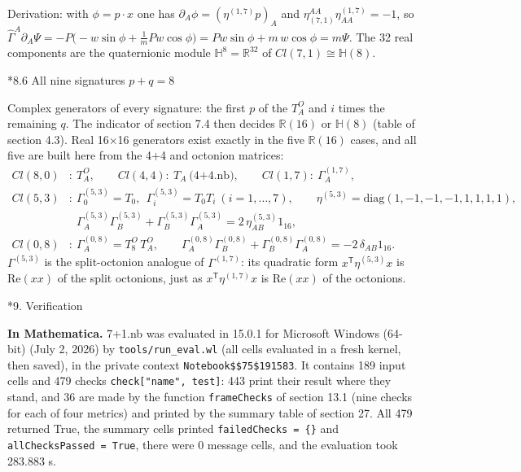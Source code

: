 \documentclass[10pt,a4paper]{article}
\makeatletter
\renewcommand\section{\@startsection{section}{1}{\z@}{-3.5ex \@plus -1ex \@minus -.2ex}{2.3ex \@plus.2ex}{\normalfont\Large\bfseries\raggedright}}
\renewcommand\subsection{\@startsection{subsection}{2}{\z@}{-3.25ex\@plus -1ex \@minus -.2ex}{1.5ex \@plus .2ex}{\normalfont\large\bfseries\raggedright}}
\makeatother
\begin{document}
Derivation: with $\phi=p\cdot x$ one has $\partial_A\phi=(\eta^{(1,7)}p)_A$ and $\eta_{(7,1)}^{AA}\eta^{(1,7)}_{AA}=-1$, so $\widehat\Gamma^{A}\partial_A\Psi=-P\big(-w\sin\phi+\tfrac1mPw\cos\phi\big)=Pw\sin\phi+m\,w\cos\phi=m\Psi$. The 32 real components are the quaternionic module $\mathbb H^8=\mathbb R^{32}$ of $Cl(7,1)\cong\mathbb H(8)$.

\subsection*{8.6 All nine signatures \texorpdfstring{$p+q=8$}{p+q=8}}
Complex generators of every signature: the first $p$ of the $T^{O}_A$ and $i$ times the remaining $q$. The indicator of section 7.4 then decides $\mathbb R(16)$ or $\mathbb H(8)$ (table of section 4.3). Real 16×16 generators exist exactly in the five $\mathbb R(16)$ cases, and all five are built here from the 4+4 and octonion matrices:
\begin{align*}
Cl(8,0)&:\ T^{O}_A,\qquad Cl(4,4):\ T_A\ \text{(4+4.nb)},\qquad Cl(1,7):\ \Gamma^{(1,7)}_A, \\
Cl(5,3)&:\ \Gamma^{(5,3)}_0=T_0,\ \ \Gamma^{(5,3)}_i=T_0T_i\ (i=1,\dots,7),\qquad \eta^{(5,3)}=\mathrm{diag}(1,-1,-1,-1,1,1,1,1), \\
&\phantom{:}\ \Gamma^{(5,3)}_A\Gamma^{(5,3)}_B+\Gamma^{(5,3)}_B\Gamma^{(5,3)}_A=2\,\eta^{(5,3)}_{AB}1_{16}, \\
Cl(0,8)&:\ \Gamma^{(0,8)}_A=T^{O}_8\,T^{O}_A,\qquad \Gamma^{(0,8)}_A\Gamma^{(0,8)}_B+\Gamma^{(0,8)}_B\Gamma^{(0,8)}_A=-2\,\delta_{AB}1_{16}.
\end{align*}
$\Gamma^{(5,3)}$ is the split-octonion analogue of $\Gamma^{(1,7)}$: its quadratic form $x^{\mathsf T}\eta^{(5,3)}x$ is $\mathrm{Re}(xx)$ of the split octonions, just as $x^{\mathsf T}\eta^{(1,7)}x$ is $\mathrm{Re}(xx)$ of the octonions.

\section*{9. Verification}
\textbf{In Mathematica.} 7+1.nb was evaluated in 15.0.1 for Microsoft Windows (64-bit) (July 2, 2026) by \texttt{tools/\allowbreak{}run\_\allowbreak{}eval.wl} (all cells evaluated in a fresh kernel, then saved), in the private context \texttt{Notebook\$\$75\$191583}. It contains 189 input cells and 479 checks \texttt{check["name", test]}: 443 print their result where they stand, and 36 are made by the function \texttt{frameChecks} of section 13.1 (nine checks for each of four metrics) and printed by the summary table of section 27. All 479 returned True, the summary cells printed \texttt{failedChecks = \{\}} and \texttt{allChecksPassed = True}, there were 0 message cells, and the evaluation took 283.883 s.
\end{document}
